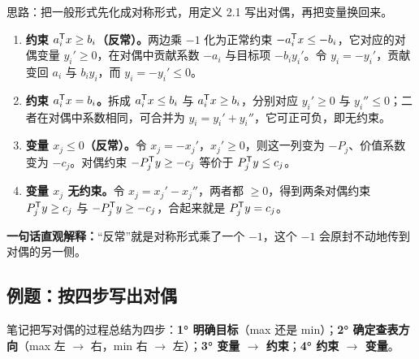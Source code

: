 \begin{proofbox}
思路：把一般形式先化成对称形式，用定义 2.1 写出对偶，再把变量换回来。
\begin{enumerate}[leftmargin=1.5em]
  \item \textbf{约束 $a_i^{\mathsf T} x\ge b_i$（反常）。}两边乘 $-1$ 化为正常约束 $-a_i^{\mathsf T} x\le-b_i$，它对应的对偶变量 $y_i'\ge0$，在对偶中贡献系数 $-a_i$ 与目标项 $-b_iy_i'$。令 $y_i=-y_i'$，贡献变回 $a_i$ 与 $b_iy_i$，而 $y_i=-y_i'\le0$。
  \item \textbf{约束 $a_i^{\mathsf T} x=b_i$。}拆成 $a_i^{\mathsf T} x\le b_i$ 与 $a_i^{\mathsf T} x\ge b_i$，分别对应 $y_i'\ge0$ 与 $y_i''\le0$；二者在对偶中系数相同，可合并为 $y_i=y_i'+y_i''$，它可正可负，即无约束。
  \item \textbf{变量 $x_j\le0$（反常）。}令 $x_j=-x_j'$，$x_j'\ge0$，则这一列变为 $-P_j$、价值系数变为 $-c_j$。对偶约束 $-P_j^{\mathsf T} y\ge-c_j$ 等价于 $P_j^{\mathsf T} y\le c_j$。
  \item \textbf{变量 $x_j$ 无约束。}令 $x_j=x_j'-x_j''$，两者都 $\ge0$，得到两条对偶约束 $P_j^{\mathsf T} y\ge c_j$ 与 $-P_j^{\mathsf T} y\ge-c_j$，合起来就是 $P_j^{\mathsf T} y=c_j$。
\end{enumerate}
\textbf{一句话直观解释：}“反常”就是对称形式乘了一个 $-1$，这个 $-1$ 会原封不动地传到对偶的另一侧。
\end{proofbox}

\subsection{例题：按四步写出对偶}

笔记把写对偶的过程总结为四步：\textbf{1° 明确目标}（max 还是 min）；\textbf{2° 确定查表方向}（max 左 $\to$ 右，min 右 $\to$ 左）；\textbf{3° 变量 $\to$ 约束}；\textbf{4° 约束 $\to$ 变量}。

